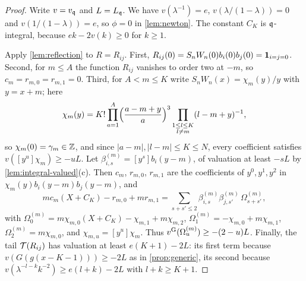 \begin{proof}
Write $v=v_{\mathfrak{q}}$ and $L=L_{\mathfrak{q}}$. We have $v(\lambda^{-1})=e$, $v(\lambda/(1-\lambda))=0$ and $v(1/(1-\lambda))=e$, so $\phi=0$ in \cref{lem:newton}. The constant $C_K$ is $\mathfrak{q}$-integral, because $ek-2v(k)\ge0$ for $k\ge1$.

Apply \cref{lem:reflection} to $R=R_{ij}$. First, $R_{ij}(0)=S_nW_n(0)b_i(0)b_j(0)=\mathbf{1}_{i=j=0}$. Second, for $m\le A$ the function $R_{ij}$ vanishes to order two at $-m$, so $c_m=r_{m,0}=r_{m,1}=0$. Third, for $A<m\le K$ write $S_nW_n(x)=\chi_m(y)/y$ with $y=x+m$; here
\[
\chi_m(y)=K!\prod_{a=1}^A\Bigl(\frac{a-m+y}{a}\Bigr)^3\prod_{\substack{1\le l\le K\\ l\ne m}}(l-m+y)^{-1},
\]
so $\chi_m(0)=\gamma_m\in\mathbb{Z}$, and since $|a-m|,|l-m|\le K\le N$, every coefficient satisfies $v([y^u]\chi_m)\ge-uL$. Let $\beta^{(m)}_{i,s}=[y^s]b_i(y-m)$, of valuation at least $-sL$ by \cref{lem:integral-valued}(c). Then $c_m$, $r_{m,0}$, $r_{m,1}$ are the coefficients of $y^0,y^1,y^2$ in $\chi_m(y)b_i(y-m)b_j(y-m)$, and
\[
mc_m(X+C_K)-r_{m,0}+mr_{m,1}=\sum_{s+s'\le2}\beta^{(m)}_{i,s}\beta^{(m)}_{j,s'}\,\Omega^{(m)}_{s+s'},
\]
with $\Omega^{(m)}_0=m\chi_{m,0}(X+C_K)-\chi_{m,1}+m\chi_{m,2}$, $\Omega^{(m)}_1=-\chi_{m,0}+m\chi_{m,1}$, $\Omega^{(m)}_2=m\chi_{m,0}$, and $\chi_{m,u}=[y^u]\chi_m$. Thus $v^{\mathrm{G}}_{}(\Omega^{(m)}_{u})\ge-(2-u)L$. Finally, the tail $\mathcal{T}(R_{ij})$ has valuation at least $e(K+1)-2L$: its first term because $v(G(g(x-K-1)))\ge-2L$ as in \cref{prop:generic}, its second because $v(\lambda^{-l-k}k^{-2})\ge e(l+k)-2L$ with $l+k\ge K+1$.


\end{proof}

